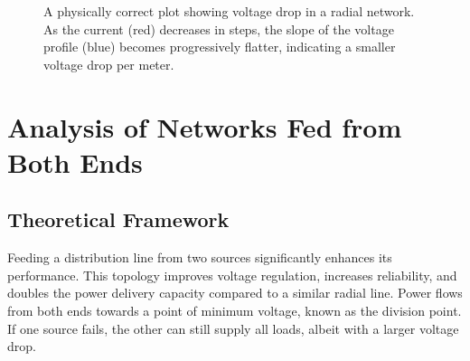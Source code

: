\documentclass[12pt, a4paper]{article}
\begin{document}
\begin{figure}[h!]
    
    \caption{A physically correct plot showing voltage drop in a radial network. As the current (red) decreases in steps, the slope of the voltage profile (blue) becomes progressively flatter, indicating a smaller voltage drop per meter.}
\end{figure}

\section{Analysis of Networks Fed from Both Ends}
\subsection{Theoretical Framework}
Feeding a distribution line from two sources significantly enhances its performance. This topology improves voltage regulation, increases reliability, and doubles the power delivery capacity compared to a similar radial line. Power flows from both ends towards a point of minimum voltage, known as the division point. If one source fails, the other can still supply all loads, albeit with a larger voltage drop.
\end{document}
